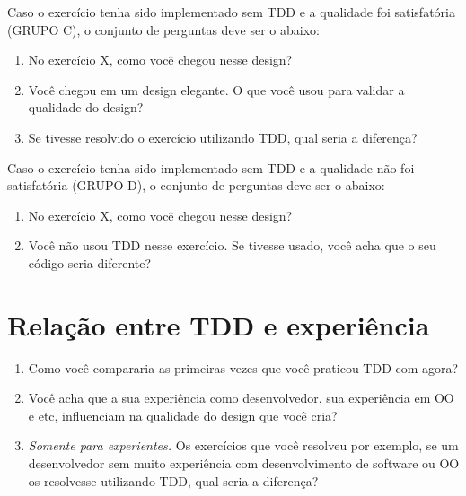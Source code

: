 Caso o exercício tenha sido implementado sem TDD e a qualidade foi satisfatória (GRUPO C),
o conjunto de perguntas deve ser o abaixo:

\begin{enumerate}
	
	\item No exercício X, como você chegou nesse design?
	
	\item Você chegou em um design elegante. O que você usou para validar a qualidade do design?
	
	\item Se tivesse resolvido o exercício utilizando TDD, qual seria a diferença?
	
\end{enumerate}

Caso o exercício tenha sido implementado sem TDD e a qualidade não foi satisfatória (GRUPO D),
o conjunto de perguntas deve ser o abaixo:

\begin{enumerate}
	
	\item No exercício X, como você chegou nesse design?
	
	\item Você não usou TDD nesse exercício. Se tivesse usado, você acha que o seu código seria diferente?
	
\end{enumerate}

\section{Relação entre TDD e experiência}

\begin{enumerate}
	\item Como você compararia as primeiras vezes que você praticou TDD com agora?

	\item Você acha que a sua experiência como desenvolvedor, sua experiência em OO e etc,
	influenciam na qualidade do design que você cria?

	\item \textit{Somente para experientes.} Os exercícios que você resolveu por exemplo, se um desenvolvedor
	sem muito experiência com desenvolvimento de software ou OO os resolvesse utilizando TDD, qual seria a diferença?

\end{enumerate}

